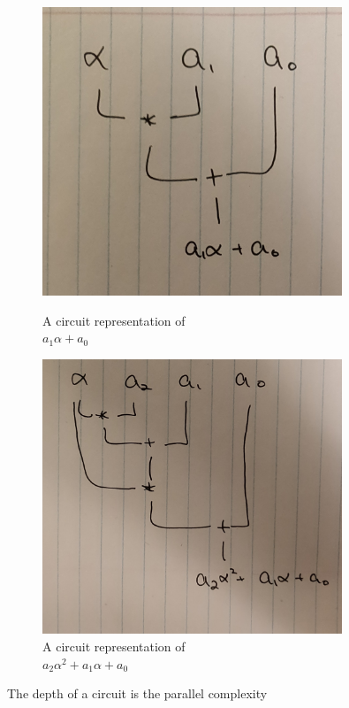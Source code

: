 \begin{figure}[h]
    \centering
    \captionsetup{justification=centering}
    \begin{minipage}{.5\textwidth}
      \centering
      \includegraphics[width=0.8\textwidth]{images/lec4-circuit-1}
      \caption{A circuit representation of \\ $a_1\alpha + a_0$}
      \label{fig:lec4-circuit-1}
    \end{minipage}%
    \begin{minipage}{.5\textwidth}
      \centering
      \includegraphics[width=0.8\textwidth]{images/lec4-circuit-2}
      \caption{{\footnotesize A circuit representation of \\ $a_2\alpha^2 + a_1\alpha + a_0$}}
      \label{fig:lec4-circuit-2}
    \end{minipage}
\end{figure}

\begin{remark}
    The depth of a circuit is the parallel complexity
\end{remark}

\newpage